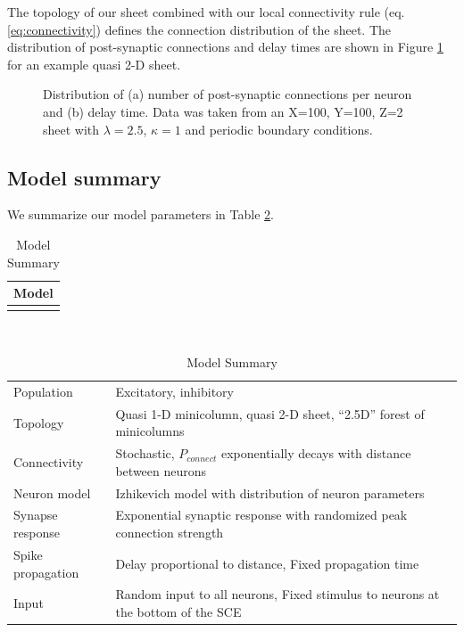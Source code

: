\documentclass[12pt]{article}
\begin{document}
The topology of our sheet combined with our local connectivity rule (eq. \ref{eq:connectivity}) defines the connection distribution of the sheet.
The distribution of post-synaptic connections and delay times are shown in Figure \ref{fig:connection_delay_distrbution_2D} for an example quasi 2-D sheet.
\begin{figure}[!htb]
 \caption{Distribution of (a) number of post-synaptic connections per neuron and (b) delay time. 
          Data was taken from an X=100, Y=100, Z=2 sheet with $\lambda=2.5$, $\kappa=1$ and periodic boundary conditions.  } 
 \label{fig:connection_delay_distrbution_2D}
\end{figure}
 \FloatBarrier

\subsection{Model summary}
We summarize our model parameters in Table \ref{tab:all_params}. 
\begin{table}[!htb]
 \caption{Model Summary}
 \label{tab:all_params}
 \centering
 \begin{tabular}{c}
  \textbf{Model} \\
  \hline \\
 \end{tabular} \\
 \begin{tabular}{ll}
  Population & Excitatory, inhibitory \\
  Topology & Quasi 1-D minicolumn, quasi 2-D sheet, ``2.5D'' forest of minicolumns \\
  Connectivity & Stochastic, $P_{connect}$ exponentially decays with distance between neurons \\
  Neuron model & Izhikevich model with distribution of neuron parameters \\
  Synapse response & Exponential synaptic response with randomized peak connection strength  \\
  Spike propagation & Delay proportional to distance, Fixed propagation time \\
  Input & Random input to all neurons, Fixed stimulus to neurons at the bottom of the SCE \\
 \end{tabular}
\end{table}
\end{document}
